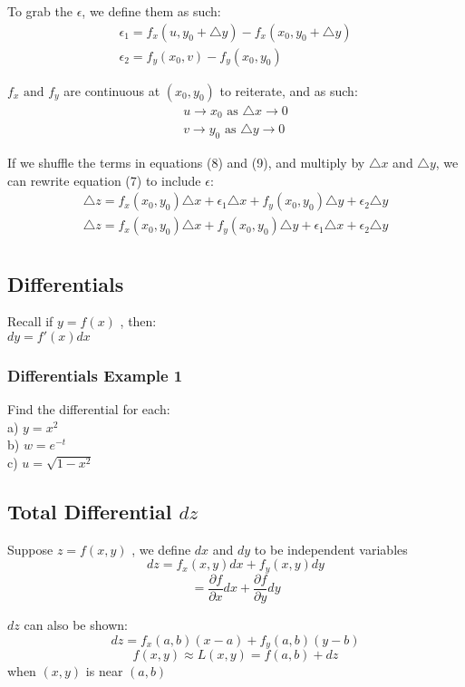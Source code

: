 \documentclass[12pt]{article}
\begin{document}
To grab the \(\epsilon\), we define them as such:
\begin{align}
	\epsilon_1 = f_x(u,y_0 + \triangle y) - f_x(x_0, y_0 + \triangle y)\\
	\epsilon_2 = f_y(x_0, v) - f_y(x_0,y_0)
\end{align}

\(f_x\text{ and } f_y\) are continuous at \((x_0,y_0)\) to reiterate, and as such:
\begin{align*}
	u \to x_0 \text{ as } \triangle x \to 0\\
	v \to y_0 \text{ as } \triangle y \to 0
\end{align*}	

If we shuffle the terms in equations (8) and (9), and multiply by \(\triangle x\) and \(\triangle y\), we can rewrite equation (7) to include \(\epsilon\):
\begin{align*}
	\triangle z = f_x(x_0,y_0)\triangle x + \epsilon_1 \triangle x + f_y(x_0,y_0)\triangle y + \epsilon_2\triangle y\\
	\triangle z = f_x(x_0,y_0)\triangle x + f_y(x_0,y_0)\triangle y + \epsilon_1 \triangle x + \epsilon_2\triangle y\\
\end{align*}

\subsection{Differentials}
Recall if \(y=f(x)\) , then: \\
\(dy=f'(x)dx\) 

\subsubsection{Differentials Example 1}
Find the differential for each:\\
a) \(y=x^2\) \\
b) \(w=e^{-t}\) \\
c) \(u=\sqrt{1-x^2}\) 

\subsection{Total Differential \(dz\) }
Suppose \(z=f(x,y)\) , we define \(dx\) and \(dy\) to be independent variables\
\[
	dz = f_x(x,y)dx + f_y(x,y)dy
\]
\[
	=\frac{\partial f}{\partial x} dx + \frac{\partial f}{\partial y} dy
\]

\(dz\) can also be shown:
\[
	dz=f_x(a,b)(x-a) + f_y(a,b)(y-b)
\]
\[
	f(x,y) \approx L(x,y) = f(a,b) + dz
\]
when \((x,y)\) is near \((a,b)\) 
\end{document}
